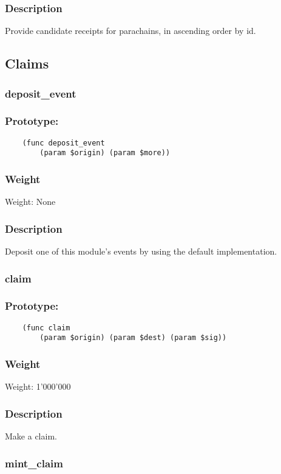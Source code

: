 \documentclass[11pt,a4paper]{article}
\begin{document}
\subsubsection*{Description}
Provide candidate receipts for parachains, in ascending order by id.

\subsection{Claims}
\subsubsection{deposit\_event}
\subsubsection*{Prototype:}
\begin{verbatim}
    (func deposit_event 
        (param $origin) (param $more))
\end{verbatim}
\subsubsection*{Weight}
Weight: None
\subsubsection*{Description}
Deposit one of this module's events by using the default implementation.

\subsubsection{claim}
\subsubsection*{Prototype:}
\begin{verbatim}
    (func claim
        (param $origin) (param $dest) (param $sig))
\end{verbatim}
\subsubsection*{Weight}
Weight: 1'000'000
\subsubsection*{Description}
Make a claim.

\subsubsection{mint\_claim}
\end{document}
